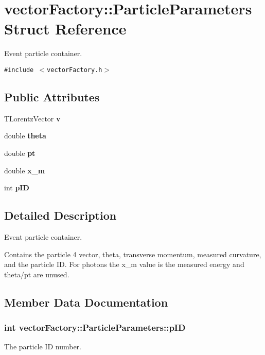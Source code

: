 \section{vector\-Factory::Particle\-Parameters Struct Reference}
\label{structvectorFactory_1_1ParticleParameters}
Event particle container.  


{\tt \#include $<$vector\-Factory.h$>$}

\subsection*{Public Attributes}
\begin{CompactItemize}
\item 
TLorentz\-Vector \bf{v}
\item 
double \bf{theta}
\item 
double \bf{pt}
\item 
double \bf{x\_\-m}
\item 
int \bf{p\-ID}
\end{CompactItemize}


\subsection{Detailed Description}
Event particle container. 

Contains the particle 4 vector, theta, transverse momentum, measured curvature, and the particle ID. For photons the x\_\-m value is the measured energy and theta/pt are unused. 



\subsection{Member Data Documentation}
\subsubsection{\setlength{\rightskip}{0pt plus 5cm}int \bf{vector\-Factory::Particle\-Parameters::p\-ID}}\label{structvectorFactory_1_1ParticleParameters_961973766aef21c93d8647d6ceb87f54}


The particle ID number. 
